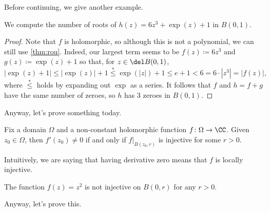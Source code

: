 Before continuing, we give another example.
\begin{exe}
	We compute the number of roots of $h(z)=6z^3+\exp(z)+1$ in $B(0,1)$.
\end{exe}
\begin{proof}
	Note that $f$ is holomorphic, so although this is not a polynomial, we can still use \autoref{thm:rou}. Indeed, our largest term seems to be $f(z)\coloneqq 6z^3$ and $g(z)\coloneqq \exp(z)+1$ so that, for $z\in\del B(0,1)$,
	\[|\exp(z)+1|\le|\exp(z)|+1\stackrel*\le\exp(|z|)+1\le e+1<6=6\cdot\left|z^3\right|=|f(z)|,\]
	where $\stackrel*\le$ holds by expanding out $\exp$ as a series. It follows that $f$ and $h=f+g$ have the same number of zeroes, so $h$ has $\boxed3$ zeroes in $B(0,1)$.
\end{proof}
Anyway, let's prove something today.
\begin{proposition} \label{prop:locallyinjective}
	Fix a domain $\Omega$ and a non-constant holomorphic function $f\colon \Omega\to\CC$. Given $z_0\in\Omega$, then $f'(z_0)\ne0$ if and only if $f|_{B(z_0,r)}$ is injective for some $r>0$.
\end{proposition}
Intuitively, we are saying that having derivative zero means that $f$ is locally injective.
\begin{ex}
	The function $f(z)=z^2$ is not injective on $B(0,r)$ for any $r>0$.
\end{ex}
Anyway, let's prove this.
